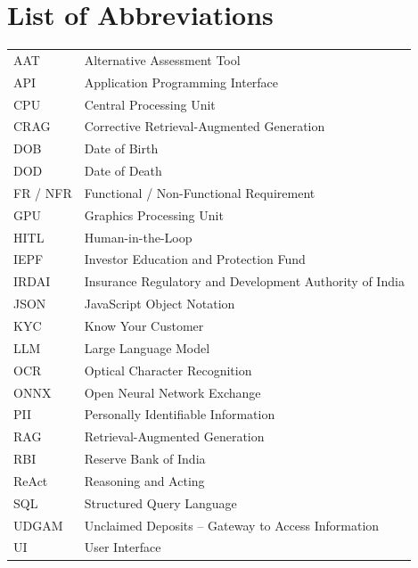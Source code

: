 \chapter*{List of Abbreviations}
\thispagestyle{frontmatter}
\begin{tabular}{@{}p{2.8cm}l@{}}
AAT & Alternative Assessment Tool \\
API & Application Programming Interface \\
CPU & Central Processing Unit \\
CRAG & Corrective Retrieval-Augmented Generation \\
DOB & Date of Birth \\
DOD & Date of Death \\
FR / NFR & Functional / Non-Functional Requirement \\
GPU & Graphics Processing Unit \\
HITL & Human-in-the-Loop \\
IEPF & Investor Education and Protection Fund \\
IRDAI & Insurance Regulatory and Development Authority of India \\
JSON & JavaScript Object Notation \\
KYC & Know Your Customer \\
LLM & Large Language Model \\
OCR & Optical Character Recognition \\
ONNX & Open Neural Network Exchange \\
PII & Personally Identifiable Information \\
RAG & Retrieval-Augmented Generation \\
RBI & Reserve Bank of India \\
ReAct & Reasoning and Acting \\
SQL & Structured Query Language \\
UDGAM & Unclaimed Deposits -- Gateway to Access Information \\
UI & User Interface \\
\end{tabular}
